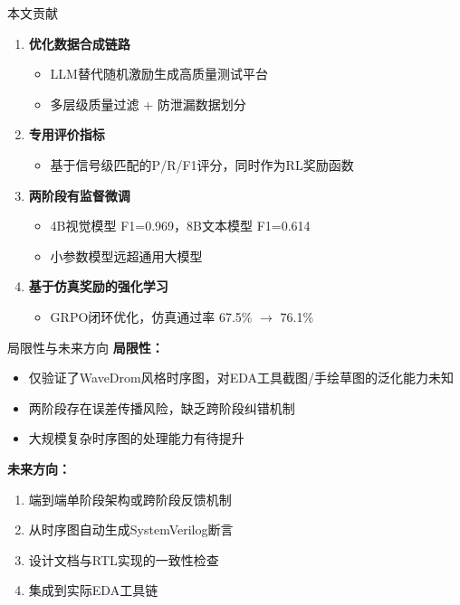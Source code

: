 \documentclass[aspectratio=169,10pt]{beamer}
\begin{document}
\begin{frame}{本文贡献}
\begin{enumerate}
  \item \textbf{优化数据合成链路}
  \begin{itemize}
    \item LLM替代随机激励生成高质量测试平台
    \item 多层级质量过滤 + 防泄漏数据划分
  \end{itemize}

  \vspace{0.3em}
  \item \textbf{专用评价指标}
  \begin{itemize}
    \item 基于信号级匹配的P/R/F1评分，同时作为RL奖励函数
  \end{itemize}

  \vspace{0.3em}
  \item \textbf{两阶段有监督微调}
  \begin{itemize}
    \item 4B视觉模型 F1=0.969，8B文本模型 F1=0.614
    \item 小参数模型远超通用大模型
  \end{itemize}

  \vspace{0.3em}
  \item \textbf{基于仿真奖励的强化学习}
  \begin{itemize}
    \item GRPO闭环优化，仿真通过率 67.5\% $\to$ 76.1\%
  \end{itemize}
\end{enumerate}
\end{frame}

\begin{frame}{局限性与未来方向}
\textbf{局限性：}
\begin{itemize}
  \item 仅验证了WaveDrom风格时序图，对EDA工具截图/手绘草图的泛化能力未知
  \item 两阶段存在误差传播风险，缺乏跨阶段纠错机制
  \item 大规模复杂时序图的处理能力有待提升
\end{itemize}

\vspace{0.8em}
\textbf{未来方向：}
\begin{enumerate}
  \item 端到端单阶段架构或跨阶段反馈机制
  \item 从时序图自动生成SystemVerilog断言
  \item 设计文档与RTL实现的一致性检查
  \item 集成到实际EDA工具链
\end{enumerate}
\end{frame}
\end{document}
